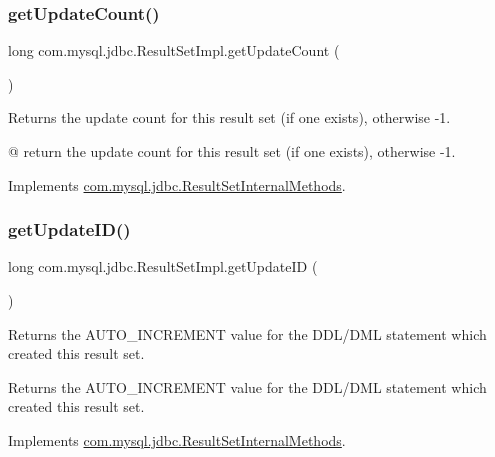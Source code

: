 \subsubsection{\texorpdfstring{get\+Update\+Count()}{getUpdateCount()}}
{\footnotesize\ttfamily long com.\+mysql.\+jdbc.\+Result\+Set\+Impl.\+get\+Update\+Count (\begin{DoxyParamCaption}{ }\end{DoxyParamCaption})}

Returns the update count for this result set (if one exists), otherwise -\/1.

@ return the update count for this result set (if one exists), otherwise -\/1. 

Implements \mbox{\hyperlink{interfacecom_1_1mysql_1_1jdbc_1_1_result_set_internal_methods_ae143240bc7e0d1553f6fec904bbf0170}{com.\+mysql.\+jdbc.\+Result\+Set\+Internal\+Methods}}.

\mbox{\label{classcom_1_1mysql_1_1jdbc_1_1_result_set_impl_a8dc70e234b2271c66c1e5b239b252b13}} 
\subsubsection{\texorpdfstring{get\+Update\+I\+D()}{getUpdateID()}}
{\footnotesize\ttfamily long com.\+mysql.\+jdbc.\+Result\+Set\+Impl.\+get\+Update\+ID (\begin{DoxyParamCaption}{ }\end{DoxyParamCaption})}

Returns the A\+U\+T\+O\+\_\+\+I\+N\+C\+R\+E\+M\+E\+NT value for the D\+D\+L/\+D\+ML statement which created this result set.

\begin{DoxyReturn}{Returns}
the A\+U\+T\+O\+\_\+\+I\+N\+C\+R\+E\+M\+E\+NT value for the D\+D\+L/\+D\+ML statement which created this result set. 
\end{DoxyReturn}


Implements \mbox{\hyperlink{interfacecom_1_1mysql_1_1jdbc_1_1_result_set_internal_methods_ae53e8a9c6f65d29a46883ba31b41ace2}{com.\+mysql.\+jdbc.\+Result\+Set\+Internal\+Methods}}.

\mbox{\label{classcom_1_1mysql_1_1jdbc_1_1_result_set_impl_a71ffe1e2049d4670597626e4dd6c7a63}} 
